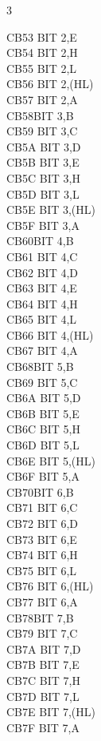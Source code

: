 \documentclass[oneside,a4paper]{book}
\begin{document}
\begin{multicols}{3}
{\begin{tabbing}
CB53\> 	BIT 2,E\\
CB54\> 	BIT 2,H\\
CB55\> 	BIT 2,L\\
CB56\> 	BIT 2,(HL)\\
CB57\> 	BIT 2,A\\
CB58\>BIT 3,B\\
CB59\> 	BIT 3,C\\
CB5A\> 	BIT 3,D\\
CB5B\> 	BIT 3,E\\
CB5C\> 	BIT 3,H\\
CB5D\> 	BIT 3,L\\
CB5E\> 	BIT 3,(HL)\\
CB5F\> 	BIT 3,A\\
CB60\>BIT 4,B\\
CB61\> 	BIT 4,C\\
CB62\> 	BIT 4,D\\
CB63\> 	BIT 4,E\\
CB64\> 	BIT 4,H\\
CB65\> 	BIT 4,L\\
CB66\> 	BIT 4,(HL)\\
CB67\> 	BIT 4,A\\
CB68\>BIT 5,B\\
CB69\> 	BIT 5,C\\
CB6A\> 	BIT 5,D\\
CB6B\> 	BIT 5,E\\
CB6C\> 	BIT 5,H\\
CB6D\> 	BIT 5,L\\
CB6E\> 	BIT 5,(HL)\\
CB6F\> 	BIT 5,A\\
CB70\>BIT 6,B\\
CB71\> 	BIT 6,C\\
CB72\> 	BIT 6,D\\
CB73\> 	BIT 6,E\\
CB74\> 	BIT 6,H\\
CB75\> 	BIT 6,L\\
CB76\> 	BIT 6,(HL)\\
CB77\> 	BIT 6,A\\
CB78\>BIT 7,B\\
CB79\> 	BIT 7,C\\
CB7A\> 	BIT 7,D\\
CB7B\> 	BIT 7,E\\
CB7C\> 	BIT 7,H\\
CB7D\> 	BIT 7,L\\
CB7E\> 	BIT 7,(HL)\\
CB7F\> 	BIT 7,A\\

\end{tabbing}}
\end{multicols}
\end{document}
